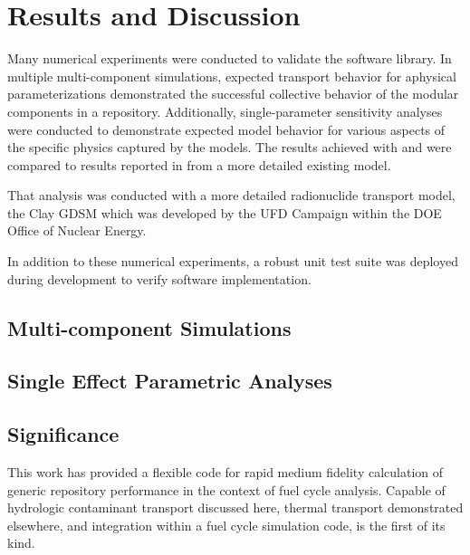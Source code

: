 \section{Results and Discussion}
\label{sec:results}

Many numerical experiments were conducted to validate the \Cyder software library.
In multiple multi-component simulations, expected transport behavior for aphysical
parameterizations demonstrated the successful collective behavior of the modular
components in a \Cyder repository. Additionally, single-parameter sensitivity
analyses were conducted to demonstrate expected model behavior for various
aspects of the specific physics captured by the models.  The results achieved
with \Cyder and \Cyclus were compared to results reported in
\cite{huff_key_2012} from a more detailed existing model.

That
analysis was conducted with a more detailed radionuclide transport model,
the Clay \gls{GDSM} which was developed by the \gls{UFD} Campaign within the
\gls{DOE} Office of Nuclear Energy.

In addition to these numerical experiments, a robust unit test suite was
deployed during development to verify \Cyder software implementation.

\subsection{Multi-component Simulations}




\subsection{Single Effect Parametric Analyses}


\FloatBarrier
\subsection{Significance}

This work has provided a flexible code for rapid medium fidelity calculation
of generic repository performance in the context of fuel cycle analysis.
Capable of hydrologic contaminant transport discussed here, thermal transport
demonstrated elsewhere, and integration within a fuel cycle simulation code,
\Cyder is the first of its kind.

